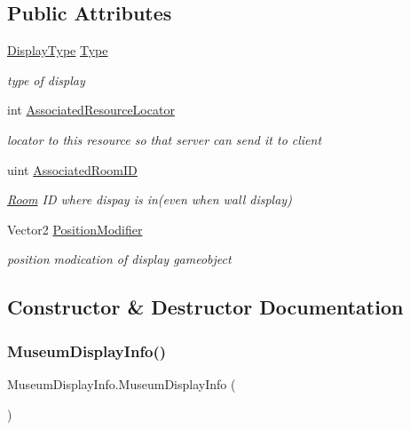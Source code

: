 \subsection*{Public Attributes}
\begin{DoxyCompactItemize}
\item 
\mbox{\hyperlink{_museum_8cs_a18c0cbeece6bcb1c64d7463ce253ff50}{Display\+Type}} \mbox{\hyperlink{class_museum_display_info_af1d44e6a63020a6ba8e2f5dff181ecbf}{Type}}
\begin{DoxyCompactList}\small\item\em type of display \end{DoxyCompactList}\item 
int \mbox{\hyperlink{class_museum_display_info_a25d91f72173cc5c600c2a3e1e381828f}{Associated\+Resource\+Locator}}
\begin{DoxyCompactList}\small\item\em locator to this resource so that server can send it to client \end{DoxyCompactList}\item 
uint \mbox{\hyperlink{class_museum_display_info_af044b6e18f3d6f17832ee2bd10c0cc62}{Associated\+Room\+ID}}
\begin{DoxyCompactList}\small\item\em \mbox{\hyperlink{class_room}{Room}} ID where dispay is in(even when wall display) \end{DoxyCompactList}\item 
Vector2 \mbox{\hyperlink{class_museum_display_info_ab51b43a4fad77be4256ee61a957bfbfb}{Position\+Modifier}}
\begin{DoxyCompactList}\small\item\em position modication of display gameobject \end{DoxyCompactList}\end{DoxyCompactItemize}


\subsection{Constructor \& Destructor Documentation}
\mbox{\label{class_museum_display_info_a755099749d31cd5c6f06a2d0210832b9}} 
\subsubsection{\texorpdfstring{Museum\+Display\+Info()}{MuseumDisplayInfo()}}
{\footnotesize\ttfamily Museum\+Display\+Info.\+Museum\+Display\+Info (\begin{DoxyParamCaption}{ }\end{DoxyParamCaption})}



